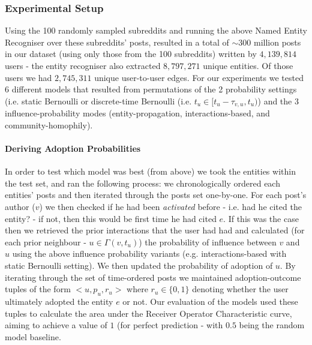 \documentclass[journal,10pt,draftclsnofoot,onecolumn]{IEEEtran}
\begin{document}
\subsubsection{Experimental Setup}
Using the 100 randomly sampled subreddits and running the above Named Entity Recogniser over these subreddits' posts, resulted in a total of $\sim300$ million posts in our dataset (using only those from the 100 subreddits) written by $4,139,814$ users - the entity recogniser also extracted $8,797,271$ unique entities.
Of those users we had $2,745,311$ unique user-to-user edges.
For our experiments we tested 6 different models that resulted from permutations of the 2 probability settings (i.e. static Bernoulli or discrete-time Bernoulli (i.e. $t_u \in [t_u - \tau_{v,u}, t_u)$) and the 3 influence-probability modes (entity-propagation, interactions-based, and community-homophily).

\paragraph{Deriving Adoption Probabilities}
In order to test which model was best (from above) we took the entities within the test set, and ran the following process: we chronologically ordered each entities' posts and then iterated through the posts set one-by-one.
For each post's author ($v$) we then checked if he had been \emph{activated} before - i.e. had he cited the entity? - if not, then this would be first time he had cited $e$.
If this was the case then we retrieved the prior interactions that the user had had and calculated (for each prior neighbour - $u \in \Gamma(v, t_u)$) the probability of influence between $v$ and $u$ using the above influence probability variants (e.g. interactions-based with static Bernoulli setting).
We then updated the probability of adoption of $u$.
By iterating through the set of time-ordered posts we maintained adoption-outcome tuples of the form $<u, p_u, r_u>$ where $r_u \in \{0,1\}$ denoting whether the user ultimately adopted the entity $e$ or not.
Our evaluation of the models used these tuples to calculate the area under the Receiver Operator Characteristic curve, aiming to achieve a value of $1$ (for perfect prediction - with $0.5$ being the random model baseline.
\end{document}
